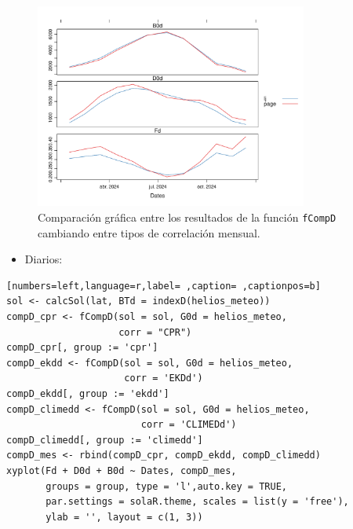 \begin{itemize}
\begin{itemize}
\begin{figure}[!htb]
\centering
\includegraphics[width=0.8\textwidth]{figuras/codigo-fcompdmes.pdf}
\caption{Comparación gráfica entre los resultados de la función \texttt{fCompD} cambiando entre tipos de correlación mensual.}
\end{figure}
\begin{itemize}
\item Diarios:
\end{itemize}
\begin{lstlisting}[numbers=left,language=r,label= ,caption= ,captionpos=b]
sol <- calcSol(lat, BTd = indexD(helios_meteo))
compD_cpr <- fCompD(sol = sol, G0d = helios_meteo,
                    corr = "CPR")
compD_cpr[, group := 'cpr']
compD_ekdd <- fCompD(sol = sol, G0d = helios_meteo,
                     corr = 'EKDd')
compD_ekdd[, group := 'ekdd']
compD_climedd <- fCompD(sol = sol, G0d = helios_meteo,
                        corr = 'CLIMEDd')
compD_climedd[, group := 'climedd']
compD_mes <- rbind(compD_cpr, compD_ekdd, compD_climedd)
xyplot(Fd + D0d + B0d ~ Dates, compD_mes,
       groups = group, type = 'l',auto.key = TRUE,
       par.settings = solaR.theme, scales = list(y = 'free'),
       ylab = '', layout = c(1, 3))
\end{lstlisting}


\end{itemize}
\end{itemize}
